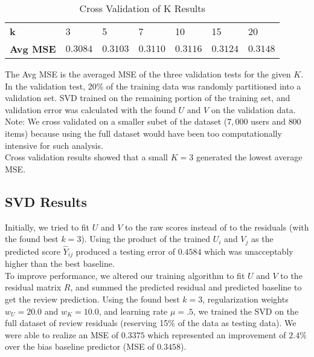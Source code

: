\documentclass[12pt]{article}
\begin{document}
\begin{table}[ht!]
\centering
\caption{Cross Validation of K Results}
\vspace{2mm}
\begin{tabular}{lllllll}
\hline
\textbf{k}              & 3          & 5             & 7             & 10        & 15        & 20 \\
\textbf{Avg MSE}        & $0.3084$   & $0.3103$      & $0.3110$      & $0.3116$  & $0.3124$  & $0.3148$\\ \hline
\end{tabular}
\end{table}

The Avg MSE is the averaged MSE of the three validation tests for the given $K$. In the validation test, 20\% of the training data was randomly partitioned into a validation set. SVD trained on the remaining portion of the training set, and validation error was calculated with the found $U$ and $V$ on the validation data. Note: We cross validated on a smaller subet of the dataset ($7,000$ users and $800$ items) because using the full dataset would have been too computationally intensive for such analysis.\\

 Cross validation results showed that a small $K = 3$ generated the lowest average MSE. \\

\subsection*{SVD Results}
Initially, we tried to fit $U$ and $V$ to the raw scores instead of to the residuals (with the found best $k = 3$). Using the product of the trained $U_i$ and $V_j$ as the predicted score $\hat Y_{ij}$ produced a testing error of $0.4584$ which was unacceptably higher than the best baseline. \\

To improve performance, we altered our training algorithm to fit $U$ and $V$ to the residual matrix $R$, and summed the predicted residual and predicted baseline to get the review prediction. Using the found best $k = 3$, regularization weights $w_U = 20.0$ and $w_K = 10.0$, and learning rate $\mu = .5$, we trained the SVD on the full dataset of review residuals (reserving 15\% of the data as testing data). We were able to realize an MSE of $0.3375$ which represented an improvement of $2.4\%$ over the bias baseline predictor (MSE of $0.3458$).
\end{document}
